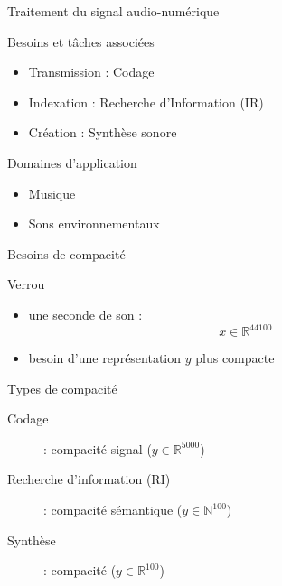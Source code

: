 \begin{frame}{Traitement du signal audio-numérique}
\begin{block}{Besoins et tâches associées}
\begin{itemize}
\item Transmission : Codage
\item Indexation : Recherche d'Information (IR)
\item Création : Synthèse sonore
\end{itemize}
\end{block}
\begin{block}{Domaines d'application}
\begin{itemize}
\item Musique
\item Sons environnementaux
\end{itemize}
\end{block}
\end{frame}


\begin{frame}{Besoins de compacité}
\begin{block}{Verrou}
\begin{itemize}
\item une seconde de son : $$ x \in \mathbb{R}^{44100}$$
\item besoin d'une représentation $y$ plus compacte
\end{itemize}
\end{block}
\begin{block}{Types de compacité}
\begin{description}
\item[Codage]: compacité signal ($ y \in \mathbb{R}^{5000}$)
\item[Recherche d'information (RI)]: compacité sémantique ($ y \in \mathbb{N}^{100}$)
\item[Synthèse]: compacité \alert{\og}  \alert{\fg} ($ y \in \mathbb{R}^{100}$)
\end{description}
\end{block}
\end{frame}